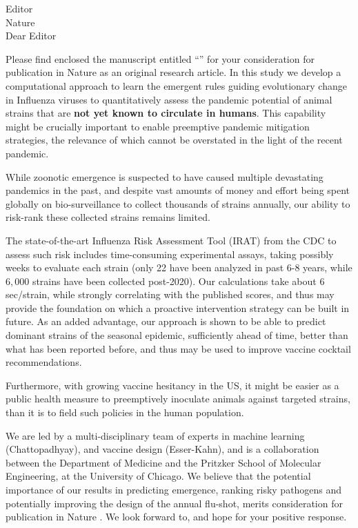 \documentclass[9pt,onecolumn,compsoc]{IEEEtran}
\newcommand{\Space}{\vspace{10pt}}
\def\EDITOR{Editor}
\def\BEDITOR{Editor\xspace}
\def\JNAME{Proceedings of the National Academy of Sciences \xspace}
\def\JNAME{Nature \xspace}
\def\JADDR{}
\begin{document}
\parskip=12pt
\parindent=0pt
\Space
\Space
\fontsize{11}{12}\selectfont
\Space
\Space

 \EDITOR\\
 \JNAME\\

Dear \BEDITOR  

Please find enclosed the  manuscript entitled ``\textbf{\TITLE}'' for your consideration for publication in \JNAME as an original research article. In this study we develop a  computational approach to learn the emergent rules guiding evolutionary change in Influenza viruses  to quantitatively assess the pandemic potential of animal strains that are \textbf{not yet known to circulate in humans}. This capability might be  crucially important to enable preemptive pandemic mitigation strategies, the relevance of which cannot be overstated in the light of the recent pandemic.

While zoonotic emergence is suspected to have caused multiple devastating pandemics in the past, and despite vast amounts of money and effort being spent globally on bio-surveillance to collect thousands of strains annually, our ability to risk-rank these collected strains remains limited.

The state-of-the-art Influenza Risk Assessment Tool (IRAT) from the CDC to assess such risk includes time-consuming experimental assays, taking possibly weeks to evaluate each strain (only 22 have been analyzed in past 6-8 years, while $6,000$ strains have been collected post-2020). Our calculations take about 6 sec/strain, while strongly correlating with the published scores, and thus may provide the foundation on which a proactive intervention strategy can be built in future. As an added advantage, our approach is shown to be able to predict dominant strains of the seasonal epidemic, sufficiently ahead of time, better than what has been reported before, and thus may be used  to improve vaccine cocktail recommendations. 


Furthermore, with growing vaccine hesitancy in the US, it might be easier as a public health measure to preemptively inoculate animals against targeted strains, than it is to field such policies in the human population.


We are led by a multi-disciplinary team  of experts in  machine learning (Chattopadhyay), and vaccine design (Esser-Kahn), and is a collaboration between the Department of Medicine and the Pritzker School of Molecular Engineering, at the University of Chicago. We believe that  the potential  importance   of our results in predicting emergence, ranking risky pathogens and potentially improving the design of the annual flu-shot,   merits consideration  for  publication in \JNAME. We look forward to, and  hope for your positive  response.
\end{document}
